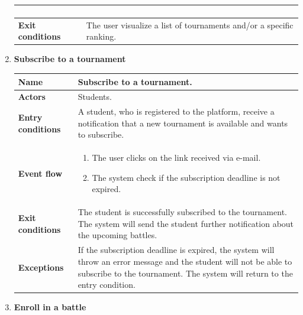 \begin{enumerate}[label=\textbf{UC.\arabic*}]
\begin{table}[H]
\begin{tabular}{|m{3.2cm}|m{9.8cm}|}
\begin{enumerate}[label=\arabic*.]
                    \end{enumerate}\\
                    \hline
                    \textbf{Exit conditions}  & The user visualize a list of tournaments and/or a specific ranking. \\
                    \hline
                \end{tabular}
        \end{table}
        \item {} \textbf{Subscribe to a tournament}
        \begin{table}[H]
    	    \centering
                \renewcommand{\arraystretch}{1.5}
                \begin{tabular}{|m{3.2cm}|m{9.8cm}|}
                    \hline
                    \textbf{Name} & Subscribe to a tournament.\\
                    \hline
                    \textbf{Actors} & Students. \\
                    \hline
                    \textbf{Entry conditions}  & A student, who is registered to the platform, receive a notification that a new tournament is available and wants to subscribe.\\
                    \hline
                    \textbf{Event flow}  & 
                    \begin{enumerate}[label=\arabic*.]
                        \item The user clicks on the link received via e-mail.
                        \item The system check if the subscription deadline is not expired.
                    \end{enumerate}\\ 
                    \hline
                    \textbf{Exit conditions}  & The student is successfully subscribed to the tournament. The system will send the student further notification about the upcoming battles. \\
                    \hline
                    \textbf{Exceptions}  & If the subscription deadline is expired, the system will throw an error message and the student will not be able to subscribe to the tournament. The system will return to the entry condition. \\
                    \hline 
                \end{tabular}
        \end{table}
        \item {} \textbf{Enroll in a battle}

\end{enumerate}
